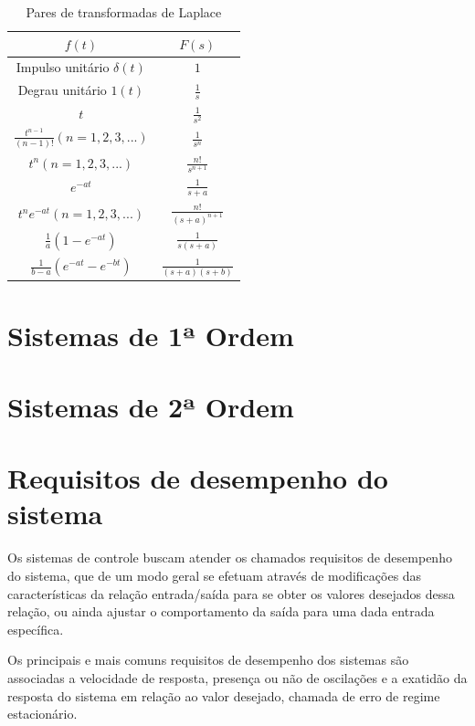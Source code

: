 \begin{table}[h]
\centering
\caption{Pares de transformadas de Laplace}
\label{tab:Laplace}
\begin{tabular}{c|c}
\hline
$f(t)$ & $F(s)$ \\
\hline
\hline
Impulso unitário $\delta(t)$ 		& $1$ 			\\ \hline
Degrau unitário $1(t)$ 			& $\frac{1}{s}$		\\ \hline
$t$ 					& $\frac{1}{s^2}$ 	\\ \hline
$\frac{t^{n-1}}{(n-1)!} (n=1,2,3,...)$ 	& $\frac{1}{s^n}$ 	\\ \hline
$t^n (n=1,2,3,...)$ 			& $\frac{n!}{s^{n+1}}$ 	\\ \hline
$e^{-at}$ 				& $\frac{1}{s+a}$ 	\\ \hline
$t^n e^{-at} (n=1,2,3,...)$ 		& $\frac{n!}{(s+a)^{n+1}}$ \\\hline
$\frac{1}{a} (1-e^{-at})$ 		& $\frac{1}{s(s+a)}$ 	\\ \hline
$\frac{1}{b-a}(e^{-at}-e^{-bt})$ 	& $\frac{1}{(s+a)(s+b)}$ \\ \hline
\end{tabular}
\end{table}


\section{Sistemas de 1ª Ordem}


\section{Sistemas de 2ª Ordem}



\section{Requisitos de desempenho do sistema}
Os sistemas de controle buscam atender os chamados requisitos de desempenho do sistema, que de um modo geral se efetuam através de modificações das características da relação entrada/saída para se obter os valores desejados dessa relação, ou ainda ajustar o comportamento da saída para uma dada entrada específica.

Os principais e mais comuns requisitos de desempenho dos sistemas são associadas a velocidade de resposta, presença ou não de oscilações e a exatidão da resposta do sistema em relação ao valor desejado, chamada de erro de regime estacionário.

